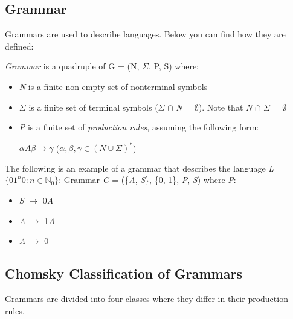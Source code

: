\subsection{Grammar}

Grammars are used to describe languages. Below you can find how they are defined:

\begin{definition}
    \textit{Grammar} is a quadruple of G = (N, $\Sigma$, P, S) where:
\end{definition}
\begin{itemize}
    \item \textit{N} is a finite non-empty set of nonterminal symbols
    \item $\Sigma$ is a finite set of terminal symbols ($\Sigma$ $\cap$ \textit{N} = $\emptyset$). Note that \textit{N} $\cap$ $\Sigma$ = $\emptyset$
    \item \textit{P} is a finite set of \textit{production rules}, assuming the following form:\\

    \centerline{$\alpha\textit{A}\beta \rightarrow \gamma$ ($\alpha, \beta, \gamma \in (\textit{N} \cup \Sigma)^*$)}
\end{itemize}

The following is an example of a grammar that describes the language \textit{L} = $\{01^\textit{n}0 : \textit{n} \in \mathbb{N}_0\}$:
Grammar \textit{G} = (\{\textit{A}, \textit{S}\}, \{0, 1\}, \textit{P}, \textit{S}) where \textit{P}:
\begin{itemize}
    \item \textit{S} $\rightarrow$ 0\textit{A}
    \item \textit{A} $\rightarrow$ 1\textit{A}
    \item \textit{A} $\rightarrow$ 0
\end{itemize}

\subsection{Chomsky Classification of Grammars}

Grammars are divided into four classes where they differ in their production rules. 

